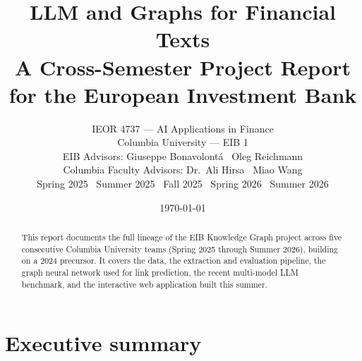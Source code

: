 \documentclass[11pt]{article}
\title{\vspace{-2em}%
  \textbf{LLM and Graphs for Financial Texts}\\[0.6em]
  \large A Cross-Semester Project Report for the European Investment Bank}
\author{IEOR 4737 --- AI Applications in Finance \\
  Columbia University --- EIB 1 \\
  EIB Advisors: Giuseppe Bonavolont\'a \textbullet\ Oleg Reichmann \\
  Columbia Faculty Advisors: Dr.\ Ali Hirsa \textbullet\ Miao Wang \\[0.4em]
  Spring 2025 \textbullet\ Summer 2025 \textbullet\ Fall 2025 \textbullet\ Spring 2026 \textbullet\ Summer 2026}
\date{\today}
\begin{document}
\maketitle

\begin{abstract}
\noindent
This report documents the full lineage of the EIB Knowledge Graph project across five consecutive Columbia University teams (Spring 2025 through Summer 2026), building on a 2024 precursor. It covers the data, the extraction and evaluation pipeline, the graph neural network used for link prediction, the recent multi-model LLM benchmark, and the interactive web application built this summer.
\end{abstract}

\tableofcontents
\clearpage

\section{Executive summary}
\end{document}
